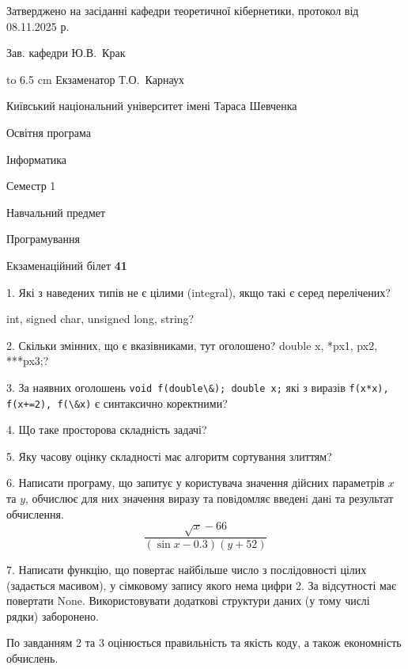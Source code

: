 \documentclass[12pt, ukrainian]{article}
\def\code#1{\Verb!#1!}
\begin{document}
{\smallskip\smallskip \begin {scriptsize} Затверджено на засіданні кафедри теоретичної кібернетики, протокол   від   08.11.2025 р.\par\smallskip\smallskip\smallskip\smallskip
{\parbox {6.5 cm} {Зав. кафедри \dotfill Ю.В.~Крак}}\hspace {0.7cm} {\hbox to 6.5 cm { Екзаменатор \dotfill Т.О.~Карнаух}} \end{scriptsize}}
\newpage
{{\begin {scriptsize}\par
{ \center  Київський національний університет імені Тараса Шевченка \par}
{\parbox {5 cm}{Освітня програма \hfill}{\parbox {7 cm}{Інформатика\hfill}}\parbox {6 cm}{\hfill Семестр 1}}\par
{\parbox {5 cm} {Навчальний предмет \hfill}\parbox {7 cm}{Програмування \hfill}\parbox {6cm}{\hfill}\par}\vspace{-15pt} \end{scriptsize}}{\center Екзаменаційний білет \No \textbf { 41 }\par}}
{%
1. Які з наведених типів не є цілими (integral), якщо такі є серед перелічених?

int, signed char, unsigned long, string?
\par
\vspace{2mm}
2. Скільки змінних, що є вказівниками, тут оголошено?
double x, *px1, px2, ***px3;?
\par
\vspace{2mm}
3. За наявних оголошень \code{void f(double\&); double x;} які з виразів \code{f(x*x), f(x+=2), f(\&x)} є синтаксично коректними?
\par
\vspace{2mm}
4. Що таке просторова складність задачі?
\par
\vspace{2mm}
5. Яку часову оцінку складності має алгоритм сортування злиттям?
\par
\vspace{2mm}
6. Написати програму, що запитує у користувача значення дійсних параметрів $x$ та $y$, обчислює для них значення виразу та повiдомляє введенi данi та результат обчислення.
$$\frac{\sqrt x - 66}{(\sin x - 0.3) (y + 52)}$$ 

\par
7. Написати функцію, що повертає найбільше число з послідовності цілих (задається масивом), у сімковому запису якого нема цифри 2. За відсутності має повертати None. Використовувати додаткові структури даних (у тому числі рядки) заборонено.

По завданням 2 та 3 оцінюється правильність та якість коду, а також економність обчислень.

}
\end{document}
